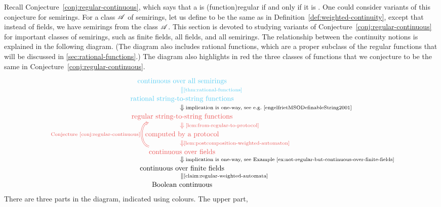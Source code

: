 \AP
Recall Conjecture~\ref{conj:regular-continuous}, which says that a
 is \kl(function){regular} if and only if it is
. One could consider variants of this conjecture for
semirings.  For a class $\mathscr A$ of semirings, let us define
 to be the same as in
Definition~\ref{def:weighted-continuity}, except that instead of fields, we
have semirings from the class $\mathscr A$. This section is devoted to studying
variants of Conjecture~\ref{conj:regular-continuous} for  important classes of
semirings, such as finite fields, all fields,  and all semirings. The
relationship between the continuity notions is explained in the following
diagram. (The diagram also includes rational functions, which are a proper
subclass of the regular functions that will be discussed in
\cref{sec:rational-functions}.) The diagram also highlights in red the three
classes of functions that we conjecture to be the same in
Conjecture~\ref{conj:regular-continuous}. 
\[
\begin{tikzcd}[row sep=small]
 \text{\blue{continuous over all semirings}}
\arrow[d,blue, equal,"\text{\cref{thm:rational-functions}}"]
\\
 \text{\blue{rational string-to-string functions}}
\ar[d,Rightarrow,"\text{ implication is one-way,  see e.g.~\cite[p. 218]{engelfrietMSODefinableString2001}}"]
\\
 \text{\red{regular string-to-string functions}}
\ar[d,red,Rightarrow,"\text{ \cref{lem:from-regular-to-protocol}}"]
\\
% 
 \text{\red{computed by a protocol}}
\ar[d,red,Rightarrow,"\text{\cref{lem:postcomposition-weighted-automaton}}"]
\\
 \text{\red{continuous over fields}}
\ar[uu, red, bend left=80,Rightarrow,"\text{ Conjecture~\ref{conj:regular-continuous}}"]
\ar[d,Rightarrow,"\text{ implication is one-way, see Example~\ref{ex:not-regular-but-continuous-over-finite-fields}}"]
\\
 \text{continuous over finite fields}
\arrow[d,equal,"\text{\cref{claim:regular-weighted-automata}}"]
\\
 \text{Boolean continuous}
\end{tikzcd}
\]
There are three parts in the diagram, indicated using colours. The upper part,
